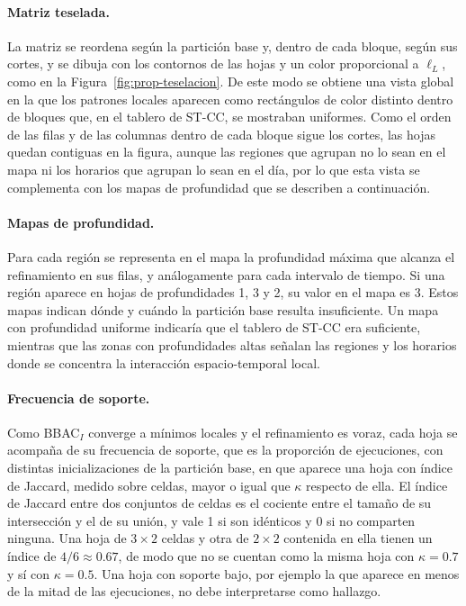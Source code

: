 \paragraph{Matriz teselada.} La matriz se reordena según la partición base y,
dentro de cada bloque, según sus cortes, y se dibuja con los contornos de las
hojas y un color proporcional a $\ell_L$, como en la
Figura~\ref{fig:prop-teselacion}. De este modo se obtiene una vista global en la
que los patrones locales aparecen como rectángulos de color distinto dentro de
bloques que, en el tablero de ST-CC, se mostraban uniformes. Como el orden de
las filas y de las columnas dentro de cada bloque sigue los cortes, las hojas
quedan contiguas en la figura, aunque las regiones que agrupan no lo sean en el
mapa ni los horarios que agrupan lo sean en el día, por lo que esta vista se
complementa con los mapas de profundidad que se describen a continuación.

\paragraph{Mapas de profundidad.} Para cada región se representa en el mapa la
profundidad máxima que alcanza el refinamiento en sus filas, y análogamente para
cada intervalo de tiempo. Si una región aparece en hojas de profundidades 1, 3 y 2,
su valor en el mapa es 3. Estos mapas indican dónde y cuándo la partición base
resulta insuficiente. Un mapa con profundidad uniforme indicaría que el tablero de
ST-CC era suficiente, mientras que las zonas con profundidades altas señalan las
regiones y los horarios donde se concentra la interacción espacio-temporal local.

\paragraph{Frecuencia de soporte.} Como BBAC$_I$ converge a mínimos locales y
el refinamiento es voraz, cada hoja se acompaña de su frecuencia de soporte,
que es la proporción de ejecuciones, con distintas inicializaciones de la partición
base, en que aparece una hoja con índice de Jaccard, medido sobre celdas,
mayor o igual que $\kappa$ respecto de ella. El índice de Jaccard entre dos
conjuntos de celdas es el cociente entre el tamaño de su intersección y el de su
unión, y vale 1 si son idénticos y 0 si no comparten ninguna. Una hoja de $3\times2$
celdas y otra de $2\times2$ contenida en ella tienen un índice de $4/6\approx0.67$,
de modo que no se cuentan como la misma hoja con $\kappa=0.7$ y sí con
$\kappa=0.5$. Una hoja con soporte bajo, por ejemplo la que aparece en menos de la
mitad de las ejecuciones, no debe interpretarse como hallazgo.


